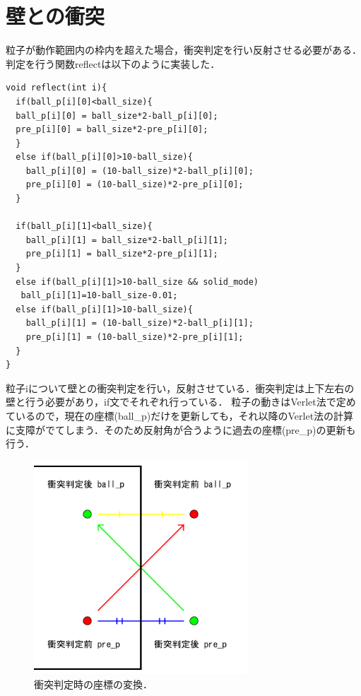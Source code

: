 \section{壁との衝突}
粒子が動作範囲内の枠内を超えた場合，衝突判定を行い反射させる必要がある．判定を行う関数reflectは以下のように実装した．
\begin{screen}
{\small
\begin{verbatim}
void reflect(int i){
  if(ball_p[i][0]<ball_size){
  ball_p[i][0] = ball_size*2-ball_p[i][0];
  pre_p[i][0] = ball_size*2-pre_p[i][0];
  }  
  else if(ball_p[i][0]>10-ball_size){
    ball_p[i][0] = (10-ball_size)*2-ball_p[i][0];
    pre_p[i][0] = (10-ball_size)*2-pre_p[i][0];
  }

  if(ball_p[i][1]<ball_size){
    ball_p[i][1] = ball_size*2-ball_p[i][1];
    pre_p[i][1] = ball_size*2-pre_p[i][1];
  }
  else if(ball_p[i][1]>10-ball_size && solid_mode)
   ball_p[i][1]=10-ball_size-0.01;  
  else if(ball_p[i][1]>10-ball_size){
    ball_p[i][1] = (10-ball_size)*2-ball_p[i][1];
    pre_p[i][1] = (10-ball_size)*2-pre_p[i][1];
  }
}
\end{verbatim}}
\end{screen}
粒子iについて壁との衝突判定を行い，反射させている．衝突判定は上下左右の壁と行う必要があり，if文でそれぞれ行っている．
粒子の動きはVerlet法で定めているので，現在の座標(ball\_p)だけを更新しても，それ以降のVerlet法の計算に支障がでてしまう．そのため反射角が合うように過去の座標(pre\_p)の更新も行う．

\begin{figure}[htbp]
 \begin{center}
  \includegraphics[width=80mm]{../implement/reflect_picture.png}
 \end{center}
 \caption{衝突判定時の座標の変換．}
 \label{fig:reflect}
\end{figure}

